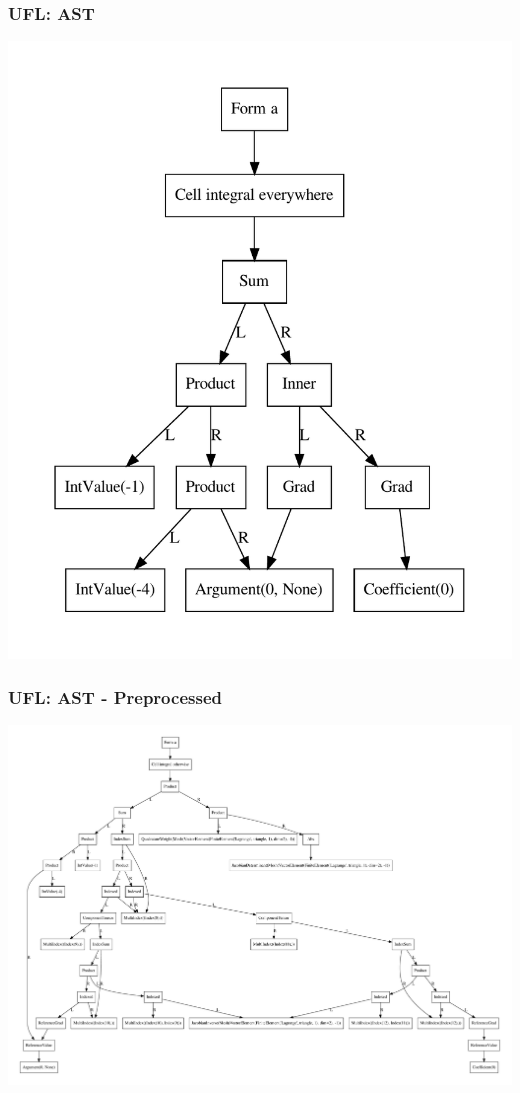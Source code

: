 \documentclass[ignorenonframetext,11pt]{beamer}
\theoremstyle{definition}
\begin{document}
\begin{frame}
  \frametitle{UFL: AST}
  \centering
  \includegraphics[scale=0.4]{figures/ufl_ast.pdf}
\end{frame}

\begin{frame}
  \frametitle{UFL: AST - Preprocessed}
  \centering
  \includegraphics[scale=0.2]{figures/ufl_ast_preprocessed.pdf}
\end{frame}
\end{document}
